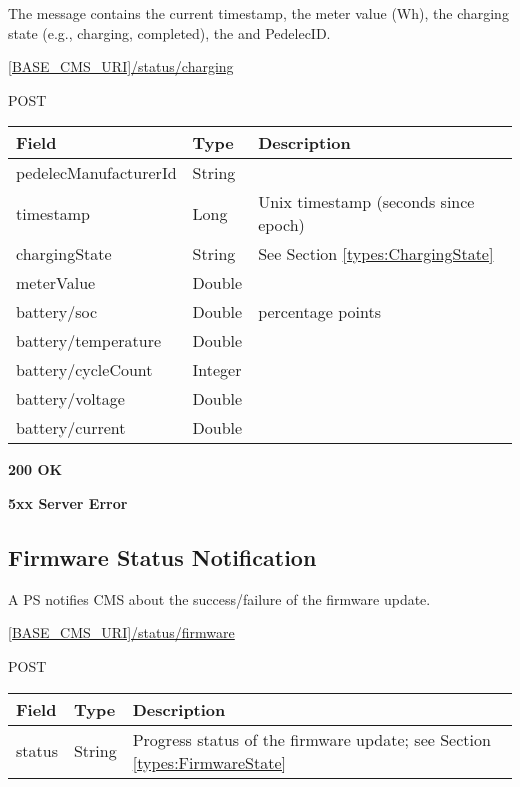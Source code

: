 The message contains the current timestamp, the meter value (Wh), the charging state (e.g., charging, completed), the and PedelecID.

 \url{[BASE_CMS_URI]/status/charging}

 POST

\newpage
{}
\begin{table}[!h]
\vspace{-7mm}
\begin{tabularx}{\linewidth}{ | l | l | X | }
  \hline
  \rowcolor{table-head}
  Field & Type & Description \\
  \hline
  	pedelecManufacturerId & String			& \\
  	timestamp & Long			& Unix timestamp (seconds since epoch) \\
  	chargingState & String		& See Section \ref{types:ChargingState} \\	
  	meterValue & Double & \\
  	battery/soc & Double & percentage points \\
  	battery/temperature & Double &  \\
  	battery/cycleCount & Integer &  \\
  	battery/voltage & Double &  \\
  	battery/current & Double &  \\
    \hline
\end{tabularx}
\end{table}

 \textbf{200 OK}

 \textbf{5xx Server Error}

\subsection{Firmware Status Notification}

A \acs{PS} notifies \acs{CMS} about the success/failure of the firmware update. 

 \url{[BASE_CMS_URI]/status/firmware}

 POST

\begin{tabularx}{\linewidth}{ | l | l | X | }
  \hline
  \rowcolor{table-head}
  Field & Type & Description \\
  \hline
  	status & String			& Progress status of the firmware update; see Section \ref{types:FirmwareState} \\	
  \hline
\end{tabularx}


